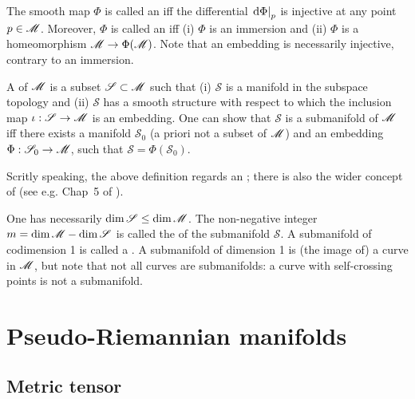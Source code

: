 The smooth map $\Phi$ is called an  iff
the differential $\left.\mathrm{d}\Phi \right| _p$ is injective at any point $p\in\mathscr{M}$.
Moreover, $\Phi$ is called an  iff (i) $\Phi$
is an immersion and (ii) $\Phi$ is a homeomorphism $\mathscr{M} \rightarrow \Phi(\mathscr{M})$.
Note that an embedding is necessarily injective, contrary to an immersion.

A  of $\mathscr{M}$ is a subset $\mathscr{S}\subset \mathscr{M}$ such
that (i) $\mathscr{S}$ is a manifold in the subspace topology and (ii)
$\mathscr{S}$ has a smooth structure with respect to which
the inclusion map $\iota: \mathscr{S} \rightarrow \mathscr{M}$ is an embedding.
One can show that $\mathscr{S}$ is a submanifold of $\mathscr{M}$ iff there exists
a manifold $\mathscr{S}_0$ (a priori not a subset of $\mathscr{M}$) and an
embedding $\Phi: \mathscr{S}_0 \rightarrow \mathscr{M}$, such that
$\mathscr{S} = \Phi(\mathscr{S}_0)$.

\begin{remark}
Scritly speaking, the above definition regards an
;
there is also the wider concept of  (see e.g. Chap~5 of \cite{Lee13}).
\end{remark}


One has necessarily $\dim \mathscr{S} \leq \dim \mathscr{M}$. The non-negative integer
$m = \dim\mathscr{M} - \dim\mathscr{S}$ is called the 
of the submanifold $\mathscr{S}$. A submanifold of codimension 1 is called
a . A submanifold of dimension 1 is
(the image of) a curve in $\mathscr{M}$, but note that not all curves are submanifolds:
a curve with self-crossing points is not a submanifold.






\section{Pseudo-Riemannian manifolds} \label{s:bas:pRiemManif}

\subsection{Metric tensor} \label{s:bas:metric}

